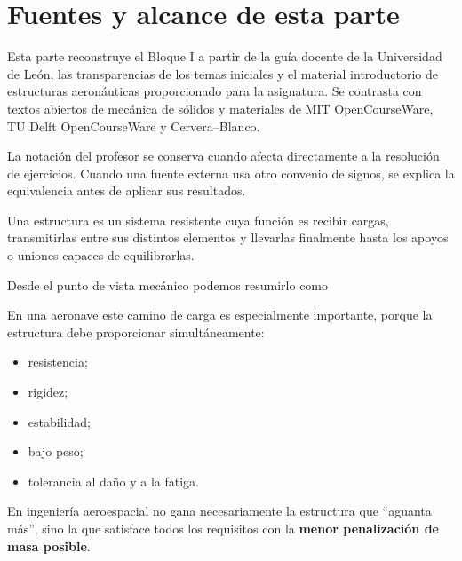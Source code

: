 \chapter*{Fuentes y alcance de esta parte}
Esta parte reconstruye el Bloque I a partir de la guía docente de la Universidad de León, las transparencias de los temas iniciales y el material introductorio de estructuras aeronáuticas proporcionado para la asignatura. Se contrasta con textos abiertos de mecánica de sólidos y materiales de MIT OpenCourseWare, TU Delft OpenCourseWare y Cervera--Blanco.\autocite{ule-guia-2026,lanza-temas12a,lanza-temas12b,ule-estructuras-intro,bucciarelli2002,tudelft-mom,cervera2015}

\begin{warningbox}
La notación del profesor se conserva cuando afecta directamente a la resolución de ejercicios. Cuando una fuente externa usa otro convenio de signos, se explica la equivalencia antes de aplicar sus resultados.
\end{warningbox}



Una estructura es un sistema resistente cuya función es recibir cargas, transmitirlas entre sus distintos elementos y llevarlas finalmente hasta los apoyos o uniones capaces de equilibrarlas.

Desde el punto de vista mecánico podemos resumirlo como


En una aeronave este camino de carga es especialmente importante, porque la estructura debe proporcionar simultáneamente:

\begin{itemize}
  \item resistencia;
  \item rigidez;
  \item estabilidad;
  \item bajo peso;
  \item tolerancia al daño y a la fatiga.
\end{itemize}

\begin{idea}
En ingeniería aeroespacial no gana necesariamente la estructura que ``aguanta más'', sino la que satisface todos los requisitos con la \textbf{menor penalización de masa posible}.
\end{idea}

